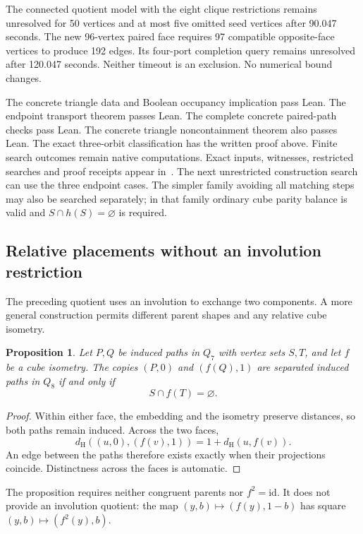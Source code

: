 \documentclass[11pt,a4paper]{article}
\newtheorem{proposition}[theorem]{Proposition}
\theoremstyle{definition}
\theoremstyle{remark}
\newcommand{\Ham}{d_{\mathrm H}}
\begin{document}
The connected quotient model with the eight clique restrictions remains
unresolved for 50 vertices and at most five omitted seed vertices after
90.047 seconds. The new 96-vertex paired face requires 97 compatible
opposite-face vertices to produce 192 edges. Its four-port completion
query remains unresolved after 120.047 seconds. Neither timeout is an
exclusion. No numerical bound changes.

The concrete triangle data and Boolean occupancy implication pass Lean. The endpoint transport theorem passes Lean. The complete concrete paired-path checks pass Lean. The concrete triangle noncontainment theorem also passes Lean. The exact three-orbit classification has the written proof above. Finite search outcomes remain native computations.
Exact inputs, witnesses, restricted searches and proof receipts appear
in~\cite{symmetry198archive}. The next unrestricted construction search
can use the three endpoint cases. The simpler family avoiding all matching
steps may also be searched separately; in that family ordinary cube
parity balance is valid and $S\cap h(S)=\varnothing$ is required.


\subsection{Relative placements without an involution restriction}
\label{sec:symmetry199}

The preceding quotient uses an involution to exchange two components.
A more general construction permits different parent shapes and any
relative cube isometry.

\begin{proposition}
Let $P,Q$ be induced paths in $Q_7$ with vertex sets $S,T$, and let
$f$ be a cube isometry. The copies $(P,0)$ and $(f(Q),1)$ are separated
induced paths in $Q_8$ if and only if
\[
S\cap f(T)=\varnothing.
\]
\end{proposition}
\begin{proof}
Within either face, the embedding and the isometry preserve distances,
so both paths remain induced. Across the two faces,
\[
\Ham((u,0),(f(v),1))=1+\Ham(u,f(v)).
\]
An edge between the paths therefore exists exactly when their projections
coincide. Distinctness across the faces is automatic.
\end{proof}
The proposition requires neither congruent parents nor $f^2=\mathrm{id}$.
It does not provide an involution quotient: the map
$(y,b)\mapsto(f(y),1-b)$ has square $(y,b)\mapsto(f^2(y),b)$.
\end{document}

